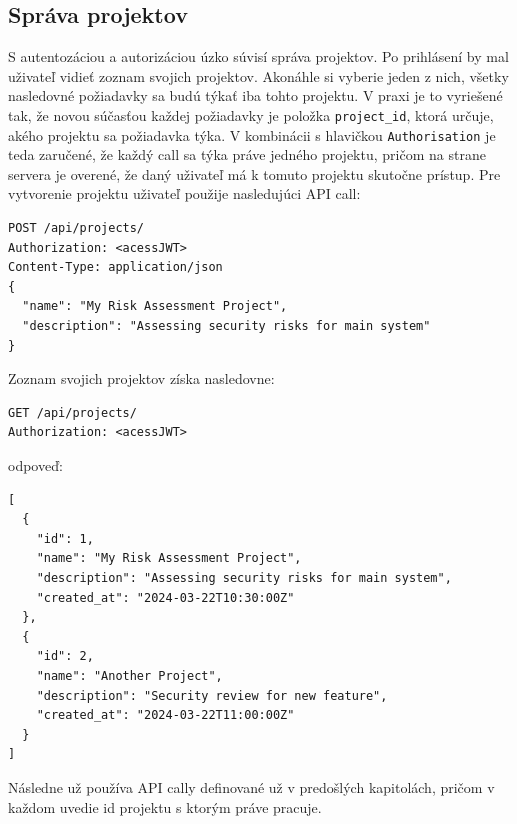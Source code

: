 \documentclass[11pt]{article}
\begin{document}
\subsection{Správa projektov}
S autentozáciou a autorizáciou úzko súvisí správa projektov. Po prihlásení by mal uživateľ vidieť zoznam svojich projektov. Akonáhle si vyberie jeden z nich, všetky nasledovné požiadavky sa budú týkať iba tohto projektu. V praxi je to vyriešené tak, že novou súčasťou každej požiadavky je položka \texttt{project\_id}, ktorá určuje, akého projektu sa požiadavka týka. V kombinácii s hlavičkou \texttt{Authorisation} je teda zaručené, že každý call sa týka práve jedného projektu, pričom na strane servera je overené, že daný uživateľ má k tomuto projektu skutočne prístup.
Pre vytvorenie projektu uživateľ použije nasledujúci API call:
\begin{verbatim}
POST /api/projects/
Authorization: <acessJWT>
Content-Type: application/json
{
  "name": "My Risk Assessment Project",
  "description": "Assessing security risks for main system"
}
\end{verbatim}
Zoznam svojich projektov získa nasledovne:
\begin{verbatim}
GET /api/projects/
Authorization: <acessJWT>
\end{verbatim}
odpoveď:
\begin{verbatim}
[
  {
    "id": 1,
    "name": "My Risk Assessment Project",
    "description": "Assessing security risks for main system",
    "created_at": "2024-03-22T10:30:00Z"
  },
  {
    "id": 2,
    "name": "Another Project",
    "description": "Security review for new feature",
    "created_at": "2024-03-22T11:00:00Z"
  }
]
\end{verbatim}
Následne už používa API cally definované už v predošlých kapitolách, pričom v každom uvedie id projektu s ktorým práve pracuje.
\end{document}
